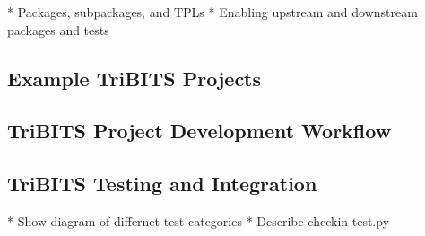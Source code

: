 \documentclass[10pt]{article}
\begin{document}
* Packages, subpackages, and TPLs
* Enabling upstream and downstream packages and tests

%
\subsection{Example TriBITS Projects}
%



%
\subsection{TriBITS Project Development Workflow}
%


%
\subsection{TriBITS Testing and Integration}
%

* Show diagram of differnet test categories
* Describe checkin-test.py








\end{document}

